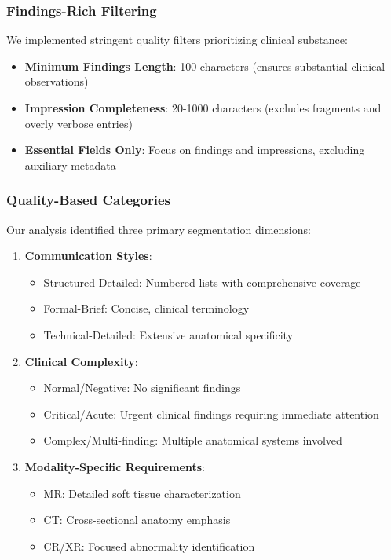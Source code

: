 \documentclass[11pt,letterpaper]{article}
\begin{document}
\subsubsection{Findings-Rich Filtering}
We implemented stringent quality filters prioritizing clinical substance:
\begin{itemize}
    \item \textbf{Minimum Findings Length}: 100 characters (ensures substantial clinical observations)
    \item \textbf{Impression Completeness}: 20-1000 characters (excludes fragments and overly verbose entries)
    \item \textbf{Essential Fields Only}: Focus on findings and impressions, excluding auxiliary metadata
\end{itemize}

\subsubsection{Quality-Based Categories}
Our analysis identified three primary segmentation dimensions:

\begin{enumerate}
    \item \textbf{Communication Styles}:
    \begin{itemize}
        \item Structured-Detailed: Numbered lists with comprehensive coverage
        \item Formal-Brief: Concise, clinical terminology
        \item Technical-Detailed: Extensive anatomical specificity
    \end{itemize}

    \item \textbf{Clinical Complexity}:
    \begin{itemize}
        \item Normal/Negative: No significant findings
        \item Critical/Acute: Urgent clinical findings requiring immediate attention
        \item Complex/Multi-finding: Multiple anatomical systems involved
    \end{itemize}

    \item \textbf{Modality-Specific Requirements}:
    \begin{itemize}
        \item MR: Detailed soft tissue characterization
        \item CT: Cross-sectional anatomy emphasis
        \item CR/XR: Focused abnormality identification
    \end{itemize}
\end{enumerate}
\end{document}
